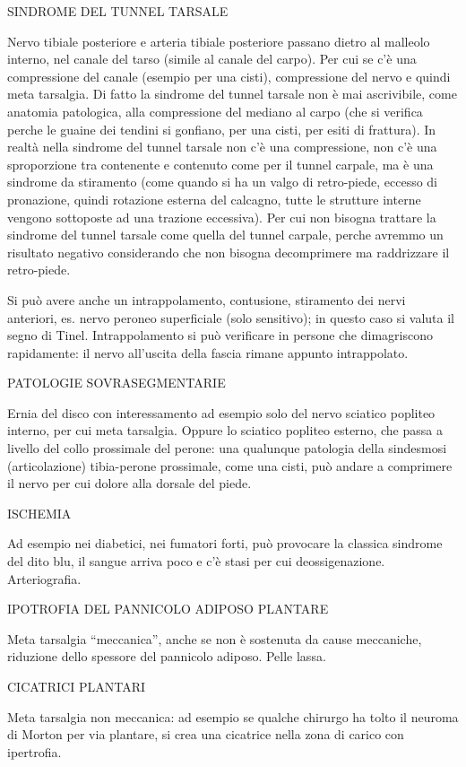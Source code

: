 \documentclass[]{article}
\begin{document}
SINDROME DEL TUNNEL TARSALE

Nervo tibiale posteriore e arteria tibiale posteriore passano dietro al
malleolo interno, nel canale del tarso (simile al canale del carpo). Per
cui se c'è una compressione del canale (esempio per una cisti),
compressione del nervo e quindi meta tarsalgia. Di fatto la sindrome del
tunnel tarsale non è mai ascrivibile, come anatomia patologica, alla
compressione del mediano al carpo (che si verifica perche le guaine dei
tendini si gonfiano, per una cisti, per esiti di frattura). In realtà
nella sindrome del tunnel tarsale non c'è una compressione, non c'è una
sproporzione tra contenente e contenuto come per il tunnel carpale, ma è
una sindrome da stiramento (come quando si ha un valgo di retro-piede,
eccesso di pronazione, quindi rotazione esterna del calcagno, tutte le
strutture interne vengono sottoposte ad una trazione eccessiva). Per cui
non bisogna trattare la sindrome del tunnel tarsale come quella del
tunnel carpale, perche avremmo un risultato negativo considerando che
non bisogna decomprimere ma raddrizzare il retro-piede.

Si può avere anche un intrappolamento, contusione, stiramento dei nervi
anteriori, es. nervo peroneo superficiale (solo sensitivo); in questo
caso si valuta il segno di Tinel. Intrappolamento si può verificare in
persone che dimagriscono rapidamente: il nervo all'uscita della fascia
rimane appunto intrappolato.

PATOLOGIE SOVRASEGMENTARIE

Ernia del disco con interessamento ad esempio solo del nervo sciatico
popliteo interno, per cui meta tarsalgia. Oppure lo sciatico popliteo
esterno, che passa a livello del collo prossimale del perone: una
qualunque patologia della sindesmosi (articolazione) tibia-perone
prossimale, come una cisti, può andare a comprimere il nervo per cui
dolore alla dorsale del piede.

ISCHEMIA

Ad esempio nei diabetici, nei fumatori forti, può provocare la classica
sindrome del dito blu, il sangue arriva poco e c'è stasi per cui
deossigenazione. Arteriografia.

IPOTROFIA DEL PANNICOLO ADIPOSO PLANTARE

Meta tarsalgia ``meccanica'', anche se non è sostenuta da cause
meccaniche, riduzione dello spessore del pannicolo adiposo. Pelle lassa.

CICATRICI PLANTARI

Meta tarsalgia non meccanica: ad esempio se qualche chirurgo ha tolto il
neuroma di Morton per via plantare, si crea una cicatrice nella zona di
carico con ipertrofia.
\end{document}
